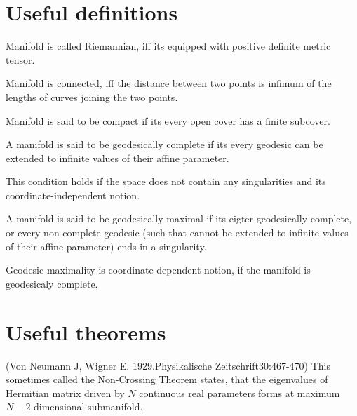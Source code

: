 \section{Useful definitions}
\begin{definition}
    Manifold is called Riemannian, iff its equipped with positive definite metric tensor.
\end{definition}
\begin{definition}
    Manifold is connected, iff the distance between two points is infimum of the lengths of curves joining the two points.
\end{definition}
\begin{definition}
    Manifold is said to be compact if its every open cover has a finite subcover.
\end{definition}
\begin{definition}
    A manifold is said to be geodesically complete if its every geodesic can be extended to infinite values of their affine parameter. 
\end{definition}
This condition holds if the space does not contain any singularities and its coordinate-independent notion.
\begin{definition}
    A manifold is said to be geodesically maximal if its eigter geodesically complete, or every non-complete geodesic (such that cannot be extended to infinite values of their affine parameter) ends in a singularity.
\end{definition}
Geodesic maximality is coordinate dependent notion, if the manifold is geodesicaly complete.


\section{Useful theorems}

\begin{thm}
    \label{thm:n-2}
(Von Neumann J, Wigner E. 1929.Physikalische Zeitschrift30:467-470)
This sometimes called the Non-Crossing Theorem states, that the eigenvalues of Hermitian matrix driven by $N$ continuous real parameters forms at maximum $N-2$ dimensional submanifold.
\end{thm}


